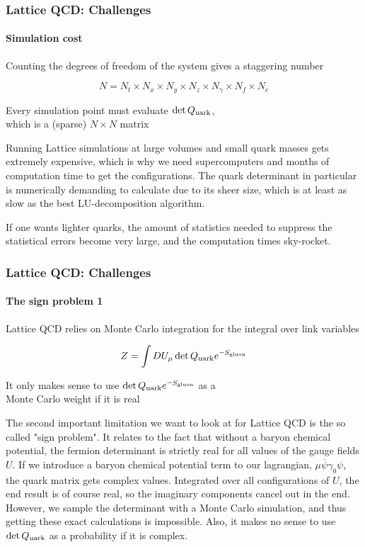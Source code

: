 \documentclass[12pt,a4paper,dvipsnames,usenames]{beamer}
\begin{document}
\begin{frame}
  \frametitle{Lattice QCD: Challenges}
  \framesubtitle{Simulation cost}

  Counting the degrees of freedom of the system gives a staggering number

  \vspace{.5em}

  \[
    N = N_t \times N_x \times N_y \times N_z \times N_{\gamma} \times N_f \times N_c
  \]

  \vspace{1em}

  Every simulation point must evaluate $\det Q_{\mathrm{uark}}$, \\
  which is a (sparse) $N \times N$ matrix

  \note
  {
    Running Lattice simulations at large volumes and small quark masses gets extremely expensive, which is why 
    we need supercomputers and months of computation time to get the configurations. The quark determinant in particular
    is numerically demanding to calculate due to its sheer size, which is at least as slow as the best LU-decomposition
    algorithm.

    If one wants lighter quarks, the amount of statistics needed to suppress the statistical errors become very large,
    and the computation times sky-rocket.
  }

\end{frame}

\begin{frame}
  \frametitle{Lattice QCD: Challenges}
  \framesubtitle{The sign problem 1}

  Lattice QCD relies on Monte Carlo integration for the integral over link variables

  \vspace{2em}

  \begin{block}{}
    \begin{equation*}
      Z = \int D U_{\mu} \det \qmat e^{\minus S_{\mathrm{gluon}}}
    \end{equation*}
  \end{block}

  \vspace{1em}

  It only makes sense to use {\mathfont $\det \qmat e^{\minus S_{\mathrm{gluon}}}$} as a \\
  Monte Carlo weight if it is real

  \note
  {
    The second important limitation we want to look at for Lattice QCD is the so called "sign problem". It relates to the fact
    that without a baryon chemical potential, the fermion determinant is strictly real for all values of the gauge fields $U$. If
    we introduce a baryon chemical potential term to our lagrangian, $\mu\bar{\psi} \gamma_0 \psi$, the quark matrix gets complex
    values. Integrated over all configurations of $U$, the end result is of course real, so the imaginary components cancel out in
    the end. However, we sample the determinant with a Monte Carlo simulation, and thus getting these exact calculations is
    impossible. Also, it makes no sense to use $\det Q_{\mathrm{uark}}$ as a probability if it is complex.
  }
\end{frame}
\end{document}
